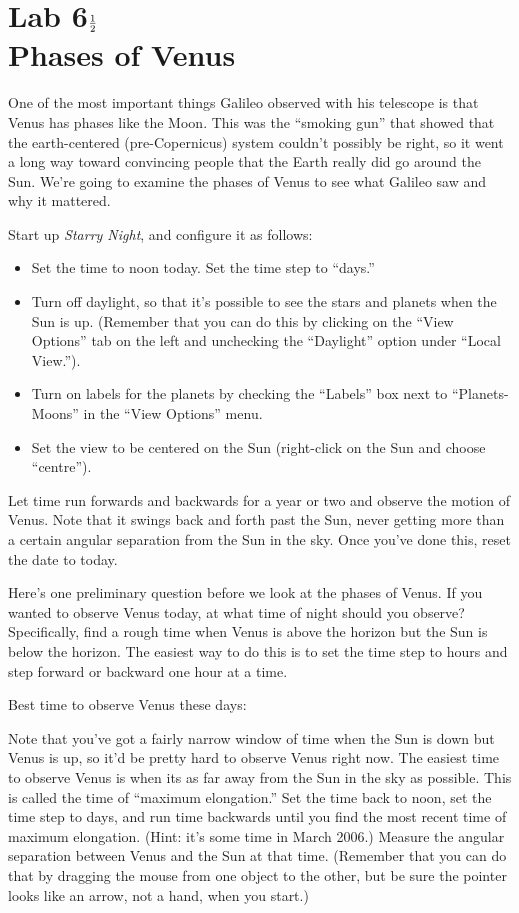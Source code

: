 \documentclass[twoside]{report}
\begin{document}
\chapter*{Lab 6$1\over 2$ \\ Phases of Venus}


One of the most important things Galileo observed with his telescope is that
Venus has phases like the Moon.   This was the ``smoking gun'' that showed
that the earth-centered (pre-Copernicus) system couldn't possibly be right,
so it went a long way toward convincing people that the Earth really did
go around the Sun.  We're going to examine the phases of Venus to see what
Galileo saw and why it mattered.

Start up {\it Starry Night}, and configure it as follows:  
\begin{itemize}
\item Set the time to noon today.  Set the time step to ``days.''
\item Turn off 
daylight, so that it's possible to see the stars and planets when the
Sun is up.  (Remember that you can do this by clicking on the ``View Options''
tab on the left and unchecking the ``Daylight'' option under ``Local View.'').
\item Turn on labels for the planets by checking the ``Labels'' box next to
``Planets-Moons'' in the ``View Options'' menu.  
\item Set the view to be centered on the Sun (right-click on the Sun and 
choose ``centre'').  
\end{itemize}

Let time run forwards and backwards for a year or two and observe the
motion of Venus.  Note that it swings back and forth past the Sun,
never getting more than a certain angular separation from the Sun in the sky.
Once you've done this, reset the date to today.

Here's one preliminary question before we look at the phases of Venus.  If
you wanted to observe Venus today, at what time of night should you observe?
Specifically, find a rough time when Venus is above the horizon but the Sun
is below the horizon.  The easiest way to do this is to set the time step
to hours and step forward or backward one hour at a time.

Best time to observe Venus these days:

\vskip 0.7in

Note that you've got a fairly narrow window of time when the Sun is
down but Venus is up, so it'd be pretty hard to observe Venus right
now.  The easiest time to observe Venus is when its as far away from
the Sun in the sky as possible.  This is called the time of ``maximum
elongation.''  Set the time back to noon, set the time step to days,
and run time backwards until you find the most recent time of maximum
elongation.  (Hint: it's some time in March 2006.)  Measure the angular
separation between
Venus and the Sun at that time.  (Remember that you can do that by 
dragging the mouse from one object to the other, but be sure the pointer
looks like an arrow, not a hand, when you start.)
\end{document}
